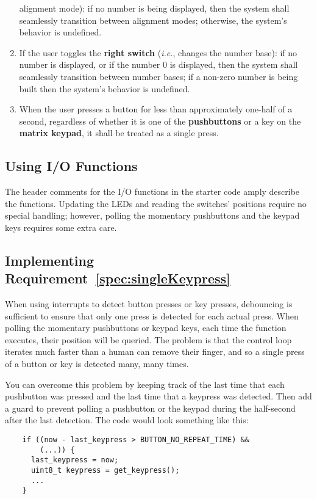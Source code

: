 \begin{enumerate}
    alignment mode): if no number is being displayed, then the system shall
    seamlessly transition between alignment modes; otherwise, the system's
    behavior is undefined.
\item If the user toggles the \textbf{right switch} (\textit{i.e.}, changes
    the number base): if no number is displayed, or if the number 0 is displayed,
    then the system shall seamlessly transition between number bases; if a
    non-zero number is being built then the system's behavior is undefined.
\item \label{spec:singleKeypress} When the user presses a button for less than
    approximately one-half of a second, regardless of whether it is one of the
    \textbf{pushbuttons} or a key on the \textbf{matrix keypad}, it shall be treated
    as a single press.
\end{enumerate}


\subsection{Using I/O Functions}

The header comments for the I/O functions in the starter code amply describe the functions.
Updating the LEDs and reading the switches' positions require no special handling;
however, polling the momentary pushbuttons and the keypad keys requires some extra care.

\subsection{Implementing Requirement~\ref{spec:singleKeypress}}

When using interrupts to detect button presses or key presses, debouncing is sufficient to ensure that only one press is detected for each actual press.
When polling the momentary pushbuttons or keypad keys, each time the  function executes, their position will be queried.
The problem is that the control loop iterates much faster than a human can remove their finger, and so a single press of a button or key is detected many, many times.

You can overcome this problem by keeping track of the last time that each pushbutton was pressed and the last time that a keypress was detected.
Then add a guard to prevent polling a pushbutton or the keypad during the half-second after the last detection.
The code would look something like this:

\begin{lstlisting}
    if ((now - last_keypress > BUTTON_NO_REPEAT_TIME) &&
        (...)) {
      last_keypress = now;
      uint8_t keypress = get_keypress();
      ...
    }
\end{lstlisting}


